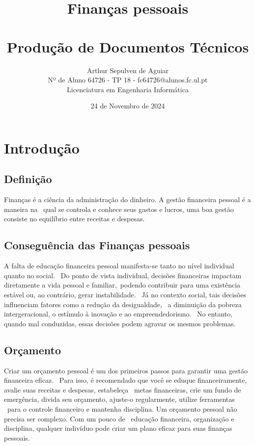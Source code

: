 \documentclass[a4paper,11pt]{report}
\title{
	\Huge{\textbf{Finanças pessoais}} \\
	\vskip 0.25cm \\
	\small{Produção de Documentos Técnicos}
}
\date{24 de Novembro de 2024}
\author{
	\small{ Arthur Sepulven de Aguiar } \\ 
	\small{ Nº de Aluno 64726 - TP 18 - fc64726@alunos.fc.ul.pt} \\
	\small{Licenciatura em Engenharia Informática}
}
\begin{document}
	\maketitle

	\tableofcontents %

	\chapter{Introdução}
		\begin{multicols}{2}

			\section{Definição \cite{intro:intro}}
				\hspace{1cm} Finanças é a ciência da administração do dinheiro. A gestão financeira pessoal é a maneira na \
				qual se controla e conhece seus gastos e lucros, uma boa gestão consiste no equilíbrio entre receitas e despesas.

			\section{Conseguência das Finanças pessoais \cite{intro:desenvolvimento}}
				\hspace{1cm} A falta de educação financeira pessoal manifesta-se tanto no nível individual quanto no social. \
				Do ponto de vista individual, decisões financeiras impactam diretamente a vida pessoal e familiar,\
				podendo contribuir para uma existência estável ou, ao contrário, gerar instabilidade. \
				Já no contexto social, tais decisões influenciam fatores como a redução da desigualdade, \
				a diminuição da pobreza intergeracional, o estímulo à inovação e ao empreendedorismo. \
				No entanto, quando mal conduzidas, essas decisões podem agravar os mesmos problemas.
			
			\section{Orçamento \cite{intro:orcamento}}
				\hspace{1cm} Criar um orçamento pessoal é um dos primeiros passos para garantir uma gestão financeira eficaz. \
				Para isso, é recomendado que você se eduque financeiramente, avalie suas receitas e despesas, estabeleça \
				metas financeiras, crie um fundo de emergência, divida seu orçamento, ajuste-o regularmente, utilize ferramentas \
				para o controle financeiro e mantenha disciplina. Um orçamento pessoal não precisa ser complexo. Com um pouco de \ 
				educação financeira, organização e disciplina, qualquer indivíduo pode criar um plano eficaz para suas finanças pessoais.


\end{multicols}
\end{document}
